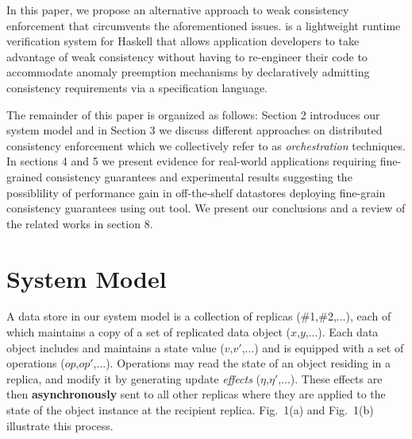 \documentclass[authorversion]{sig-alternate-05-2015}
\begin{document}
In this paper, we propose an alternative approach to weak consistency
enforcement that circumvents the aforementioned issues. \tool\; is a
lightweight runtime verification system for Haskell that allows
application developers to take advantage of weak consistency without
having to re-engineer their code to accommodate anomaly preemption
mechanisms by declaratively admitting consistency
requirements via a specification language.

The remainder of this paper is organized as follows:
Section 2 introduces our system model and in Section 3 we 
discuss different approaches on distributed consistency enforcement which we
collectively refer to as \emph{orchestration} techniques. In sections 4 and 5 we present
evidence for real-world applications requiring fine-grained consistency guarantees and 
experimental results suggesting the possiblility of performance gain in off-the-shelf datastores deploying fine-grain consistency guarantees using out tool. 
We present our conclusions and a review of the related works in section 8.



\section{System Model}
A data store in our system model is a collection of replicas (\#1,\#2,...), each of
which maintains a copy of a set of replicated data object ($x$,$y$,...). 
Each data object includes and maintains a state value ($v$,$v'$,...) and is equipped with a set of 
operations ($op$,$op'$,...). Operations may read the state of an object residing 
in a replica, and modify it by generating update \emph{effects} ($\eta$,$\eta'$,...). 
These effects are then {\bf asynchronously} sent to all other replicas where they are applied to the state 
of the object instance at the recipient replica. 
Fig.~1(a) and Fig.~1(b) illustrate this process.
\end{document}
